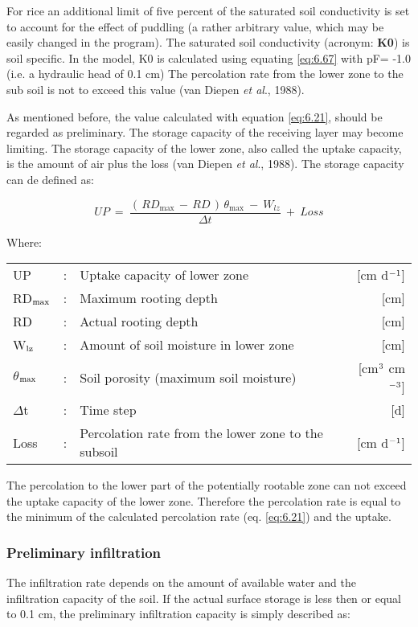 For rice an additional limit of five percent of the saturated soil conductivity is set to
account for the effect of puddling (a rather arbitrary value, which may be easily changed
in the program). The saturated soil conductivity (acronym: {\bf K0}) is soil specific. In the
model, K0 is calculated using equating \ref{eq:6.67} with pF= -1.0 (i.e. a hydraulic head of 0.1
cm) The percolation rate from the lower zone to the sub soil is not to exceed this value
(van Diepen {\it et al}., 1988). 

As mentioned before, the value calculated with equation \ref{eq:6.21}, should be regarded as
preliminary. The storage capacity of the receiving layer may become limiting. The
storage capacity of the lower zone, also called the uptake capacity, is the amount of air
plus the loss (van Diepen {\it et al}., 1988). The storage capacity can de defined as:

\begin{equation}
\label{eq:6.25}
UP  ~=~{\frac{(\, RD _{\max } \, -\, RD\, )\, \theta  _{\max } ~-~ W _{lz} }{\Delta t}} ~+~ Loss
\end{equation}

Where:\\[5pt]
\begin{tabularx}{\textwidth}{llXr}
	UP &:& Uptake capacity of lower zone  & [cm d$^{{\rm -1}}$]\\
	RD$_{{\rm max}}$ &:& Maximum rooting depth  & [cm]\\
	RD &:& Actual rooting depth  & [cm]\\
	W$_{{\rm lz}}$ &:& Amount of soil moisture in lower zone  & [cm]\\
	$\theta$$_{{\rm max}}$ &:& Soil porosity (maximum soil moisture)  & [cm$^{{\rm 3}}$ cm$^{{\rm -3}}$]\\
	$\Delta$t &:& Time step  & [d]\\
	Loss &:& Percolation rate from the lower zone to the subsoil   & [cm d$^{{\rm -1}}$]\\
\end{tabularx}

The percolation to the lower part of the potentially rootable zone can not exceed the
uptake capacity of the lower zone. Therefore the percolation rate is equal to the minimum
of the calculated percolation rate (eq. \ref{eq:6.21}) and the uptake.

\subsubsection{Preliminary infiltration}
The infiltration rate depends on the amount of available water and the infiltration capacity
of the soil. If the actual surface storage is less then or equal to 0.1 cm, the preliminary
infiltration capacity is simply described as:

